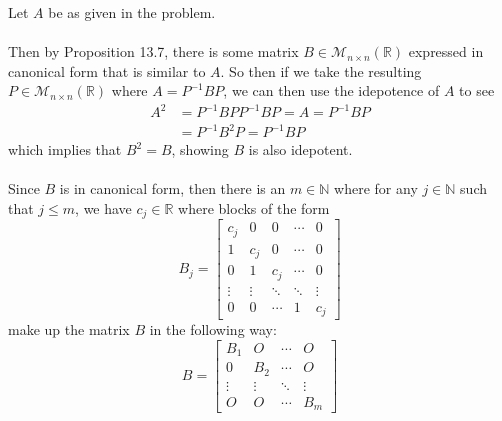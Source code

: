\documentclass{article}
\begin{document}
\begin{solution}
Let $A$ be as given in the problem.

\paragraph{}
Then by Proposition 13.7, there is some matrix $B\in \mathcal{M}_{n\times n}(\mathbb{R})$ expressed in canonical form that is similar to $A$. So then if we take the resulting $P \in \mathcal{M}_{n\times n}(\mathbb{R})$ where $A = P^{-1}BP$, we can then use the idepotence of $A$ to see
\begin{align*}
A^{2} &= P^{-1}BPP^{-1}BP = A = P^{-1}BP \\
&= P^{-1}B^{2}P = P^{-1}BP
\end{align*}
which implies that $B^{2}=B$, showing $B$ is also idepotent.

\paragraph{}
Since $B$ is in canonical form, then there is an $m\in\mathbb{N}$ where for any $j\in\mathbb{N}$ such that $j\le m$, we have $c_{j}\in\mathbb{R}$ where blocks of the form
\[
B_{j} = 
\begin{bmatrix}
c_{j} & 0 & 0 & \cdots & 0 \\
1 & c_{j} & 0 & \cdots & 0 \\
0 & 1 & c_{j} & \cdots & 0 \\
\vdots & \vdots & \ddots & \ddots & \vdots \\
0 & 0 & \cdots & 1 & c_{j}
\end{bmatrix}
\]
make up the matrix $B$ in the following way:
\[
B =
\begin{bmatrix}
B_{1} & O & \cdots & O \\
0 & B_{2} & \cdots & O \\
\vdots & \vdots & \ddots & \vdots \\
O & O & \cdots & B_{m}
\end{bmatrix}
\]


\end{solution}
\end{document}
